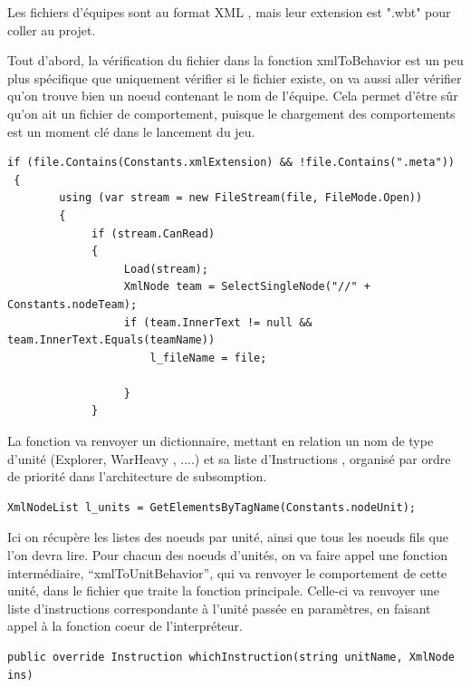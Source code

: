 \documentclass{report}
\begin{document}
Les fichiers d'équipes sont au format XML , mais leur extension est ".wbt" pour coller au projet.

Tout d'abord, la vérification du fichier dans la fonction xmlToBehavior est un peu plus spécifique que uniquement vérifier si le fichier existe, on va aussi aller vérifier qu'on trouve bien un noeud contenant le nom de l'équipe. Cela permet d'être sûr qu'on ait un fichier de comportement, puisque le chargement des comportements est un moment clé dans le lancement du jeu.

\begin{lstlisting}[frame=single]
 if (file.Contains(Constants.xmlExtension) && !file.Contains(".meta"))
 {
        using (var stream = new FileStream(file, FileMode.Open))
        {
             if (stream.CanRead)
             {
                  Load(stream);
                  XmlNode team = SelectSingleNode("//" + Constants.nodeTeam);
                  if (team.InnerText != null && team.InnerText.Equals(teamName))
                      l_fileName = file;

                  }
             }

\end{lstlisting}


La fonction va renvoyer un dictionnaire, mettant en relation un nom de type d'unité (Explorer, WarHeavy , ....) et sa liste d'Instructions , organisé par ordre de priorité dans l'architecture de subsomption.

\begin{lstlisting}[frame=single]
XmlNodeList l_units = GetElementsByTagName(Constants.nodeUnit);
\end{lstlisting}

Ici on récupère les listes des noeuds par unité, ainsi que tous les noeuds fils que l’on devra lire.
Pour chacun des noeuds d'unités, on va faire appel une fonction intermédiaire, “xmlToUnitBehavior”, qui va renvoyer le comportement de cette unité, dans le fichier que traite la fonction principale.
Celle-ci va renvoyer une liste d’instructions correspondante à l’unité passée en paramètres, en faisant appel à la fonction coeur de l’interpréteur.

\begin{lstlisting}[frame=single]
public override Instruction whichInstruction(string unitName, XmlNode ins)
\end{lstlisting}
\end{document}
